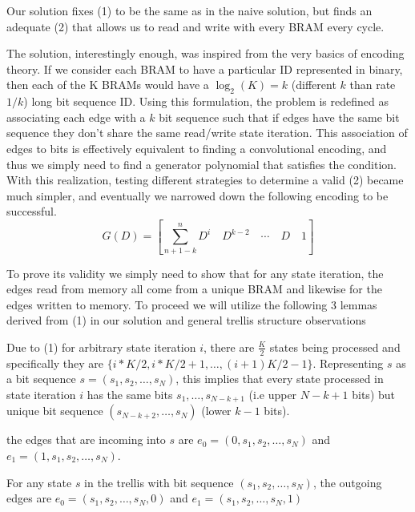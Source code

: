 Our solution fixes (1) to be the same as in the naive solution, but finds an adequate (2) that allows us to read and write with every BRAM every cycle. 

The solution, interestingly enough, was inspired from the very basics of encoding theory. If we consider each BRAM to have a particular ID represented in binary, then each of the K BRAMs would have a $\log_2(K) = k$ (different $k$ than rate $1/k$) long bit sequence ID. Using this formulation, the problem is redefined as associating each edge with a $k$ bit sequence such that if edges have the same bit sequence they don't share the same read/write state iteration. This association of edges to bits is effectively equivalent to finding a convolutional encoding, and thus we simply need to find a generator polynomial that satisfies the condition. With this realization, testing different strategies to determine a valid (2) became much simpler, and eventually we narrowed down the following encoding to be successful. 
$$G(D) = [ \sum_{n+1-k}^n D^i \quad D^{k-2} \quad \cdots \quad D \quad 1] $$

To prove its validity we simply need to show that for any state iteration, the edges read from memory all come from a unique BRAM and likewise for the edges written to memory. To proceed we will utilize the following 3 lemmas derived from (1) in our solution and general trellis structure observations

\begin{Thm:Lemma}
Due to (1) for arbitrary state iteration $i$, there are $\frac{K}{2}$ states being processed and specifically they are $\{i*K/2, i* K/2+1, \ldots, (i+1)K/2-1\}$. Representing $s$ as a bit sequence $s = (s_1, s_2, \ldots, s_N)$, this implies that every state processed in state iteration $i$ has the same bits $s_1, \ldots, s_{N-k+1}$ (i.e upper $N-k+1$ bits) but unique bit sequence $(s_{N-k+2}, \ldots, s_N)$ (lower $k-1$ bits).
 \label{Thm:Lemma:DecoderHW:Lemma1}
\end{Thm:Lemma}

\begin{Thm:Lemma}
 the edges that are incoming into $s$ are $e_0 = (0, s_1, s_2, \ldots, s_N)$ and $e_1 = (1, s_1, s_2, \ldots, s_N)$.
 \label{Thm:Lemma:DecoderHW:Lemma2}
\end{Thm:Lemma}

\begin{Thm:Lemma}
For any state $s$ in the trellis with bit sequence $(s_1, s_2, \ldots, s_N)$, the outgoing edges are $e_0 = (s_1, s_2, \ldots, s_N, 0)$ and $e_1 = (s_1, s_2, \ldots, s_N, 1)$
\label{Thm:Lemma:DecoderHW:Lemma3}
\end{Thm:Lemma}

